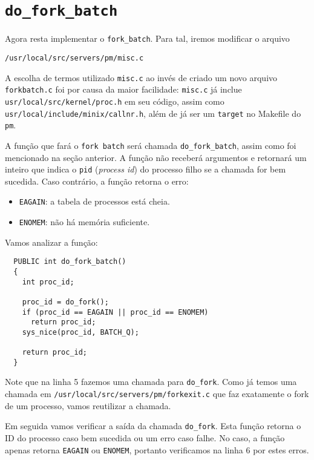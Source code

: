 \documentclass{amsart}
\theoremstyle{plain}
\newcommand{\code}[1]{\lstinline[mathescape=true]{#1}}
\begin{document}
\section{\code{do_fork_batch}}

Agora resta implementar o \code{fork_batch}. Para tal, iremos modificar o arquivo

\begin{lstlisting}[frame=leftline,mathescape=true,style=nonumbers]
/usr/local/src/servers/pm/misc.c
\end{lstlisting}

A escolha de termos utilizado \code{misc.c} ao invés de criado um novo arquivo \code{forkbatch.c}
foi por causa da maior facilidade: \code{misc.c} já inclue \code{usr/local/src/kernel/proc.h} em
seu código, assim como \code{usr/local/include/minix/callnr.h}, além de já ser um \code{target} no
Makefile do \code{pm}.

A função que fará o \code{fork batch} será chamada \code{do_fork_batch}, assim como foi mencionado
na seção anterior. A função não receberá argumentos e retornará um inteiro que indica o
\code{pid} (\textit{process id}) do processo filho se a chamada for bem sucedida. Caso contrário,
a função retorna o erro:

\begin{itemize}
  \item \code{EAGAIN}: a tabela de processos está cheia.
  \item \code{ENOMEM}: não há memória suficiente.
\end{itemize}

Vamos analizar a função:
\newpage

\begin{verbatim}
  PUBLIC int do_fork_batch()
  {
    int proc_id;

    proc_id = do_fork();
    if (proc_id == EAGAIN || proc_id == ENOMEM)
      return proc_id;
    sys_nice(proc_id, BATCH_Q);

    return proc_id;
  }
\end{verbatim}

Note que na linha 5 fazemos uma chamada para \code{do_fork}. Como já temos uma chamada em
\code{/usr/local/src/servers/pm/forkexit.c} que faz exatamente o fork de um processo, vamos
reutilizar a chamada.

Em seguida vamos verificar a saída da chamada \code{do_fork}. Esta função retorna o ID do processo
caso bem sucedida ou um erro caso falhe. No caso, a função apenas retorna \code{EAGAIN} ou
\code{ENOMEM}, portanto verificamos na linha 6 por estes erros.
\end{document}
